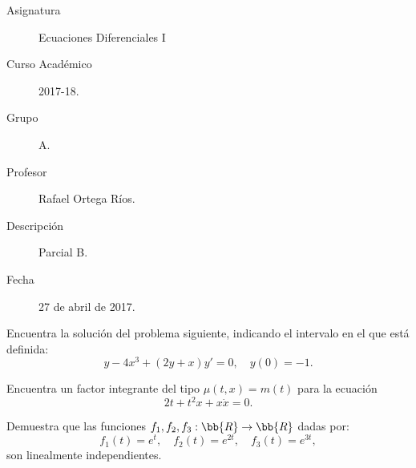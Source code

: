 \documentclass[12pt]{article}
\begin{document}

    
    

    \begin{description}
        \item[Asignatura] Ecuaciones Diferenciales I
        \item[Curso Académico] 2017-18.
        \item[Grupo] A.
        \item[Profesor] Rafael Ortega Ríos.
        \item[Descripción] Parcial B.
        \item[Fecha] 27 de abril de 2017.
    
    \end{description}
    \newpage

\begin{ejercicio}
    Encuentra la solución del problema siguiente, indicando el intervalo en el que está definida:
    \begin{equation*}
        y - 4x^3 + (2y + x)y' = 0, \quad y(0) = -1.
    \end{equation*}
\end{ejercicio}

\begin{ejercicio}
    Encuentra un factor integrante del tipo $\mu(t,x) = m(t)$ para la ecuación
    \begin{equation*}
        2t + t^2x + x\dot{x} = 0.
    \end{equation*}
\end{ejercicio}

\begin{ejercicio}
    Demuestra que las funciones $f_1,f_2,f_3:\bb{R}\to \bb{R}$ dadas por:
    \begin{equation*}
        f_1(t) = e^t, \quad f_2(t) = e^{2t}, \quad f_3(t) = e^{3t},
    \end{equation*}
    son linealmente independientes.
\end{ejercicio}
\end{document}
